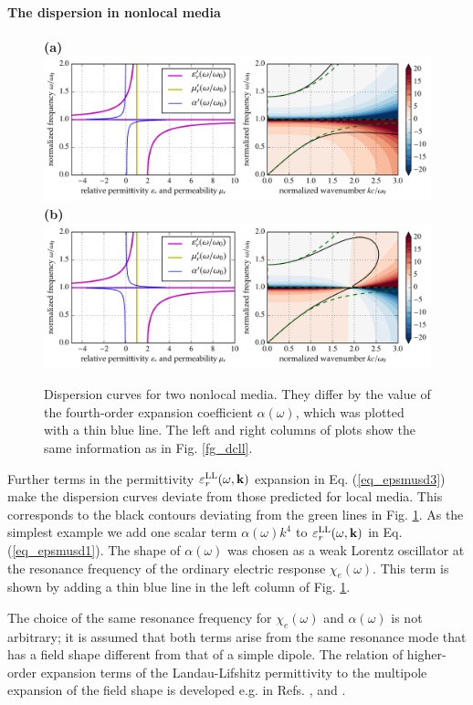 \paragraph{The dispersion in nonlocal media} %
\begin{figure}[t] \caption{Dispersion curves for two nonlocal media. They differ by the value of the fourth-order expansion coefficient $\alpha(\omega)$, which was plotted with a thin blue line. The left and right columns of plots show the same information as in Fig. \ref{fg_dcll}.  } \label{fg_dcll_nl} \centering  
\textbf{(a)}\\	\includegraphics[width=1\textwidth]{img/dispersion_landau_lifshitz/dispersion_ll_quadrupp.pdf}
\textbf{(b)}\\	\includegraphics[width=1\textwidth]{img/dispersion_landau_lifshitz/dispersion_ll_quadrupn.pdf}
\end{figure}
Further terms in the permittivity $\varepsilon_r^\text{LL}(\omega,{\mathbf{k}})$ expansion in Eq. (\ref{eq_epsmusd3}) make the dispersion curves deviate from those predicted for local media. This corresponds to the black contours deviating from the green lines in Fig. \ref{fg_dcll_nl}.
As the simplest example we add one scalar term $\alpha(\omega) k^4$ to $\varepsilon_r^\text{LL}(\omega,{\mathbf{k}})$ in Eq. (\ref{eq_epsmusd1}). The shape of $\alpha(\omega)$  was chosen as a weak Lorentz oscillator at the resonance frequency of the ordinary electric response $\chi_e(\omega)$. This term is shown by adding a thin blue line in the left column of Fig. \ref{fg_dcll_nl}.

\label{chap_sd}
The choice of the same resonance frequency for $\chi_e(\omega)$ and $\alpha(\omega)$ is not arbitrary; it is assumed that both terms arise from the same resonance mode that has a field shape different from that of a simple dipole.  The relation of higher-order expansion terms of the Landau-Lifshitz permittivity  to the multipole expansion of the field shape is developed e.g. in Refs. \cite{agranovich2006spatial}, \cite{vinogradov2002form} and \cite{fietz2011homogenization}.

